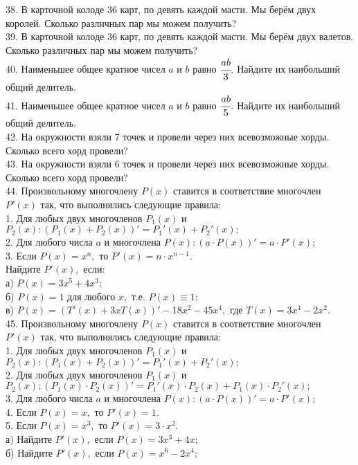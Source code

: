 38. В карточной колоде 36 карт, по девять каждой масти. Мы берём двух королей. Сколько различных пар мы можем получить?\\
39. В карточной колоде 36 карт, по девять каждой масти. Мы берём двух валетов. Сколько различных пар мы можем получить?\\
40. Наименьшее общее кратное чисел $a$ и $b$ равно $\cfrac{ab}{3}.$ Найдите их наибольший общий делитель.\\
41. Наименьшее общее кратное чисел $a$ и $b$ равно $\cfrac{ab}{5}.$ Найдите их наибольший общий делитель.\\
42. На окружности взяли 7 точек и провели через них всевозможные хорды. Сколько всего хорд провели?\\
43. На окружности взяли 6 точек и провели через них всевозможные хорды. Сколько всего хорд провели?\\
44. Произвольному многочлену $P(x)$ ставится в соответствие многочлен $P'(x)$ так, что выполнялись следующие правила:\\
1. Для любых двух многочленов $P_1(x)$ и $P_2(x): \left(P_1(x)+P_2(x)\right)'=P_1'(x)+P_2'(x);$\\
2. Для любого числа $a$ и многочлена $P(x): (a\cdot P(x))'=a\cdot P'(x);$\\
3. Если $P(x)=x^n,$ то $P'(x)=n\cdot x^{n-1}.$\\
Найдите $P'(x),$ если:\\
а) $P(x)=3x^5+4x^3;$\\
б) $P(x)=1$ для любого $x,$ т.е. $P(x)\equiv 1;$\\
в) $P(x)=(T'(x)+3xT(x))'-18x^2-45x^4,$ где $T(x)=3x^4-2x^2.$\\
45. Произвольному многочлену $P(x)$ ставится в соответствие многочлен $P'(x)$ так, что выполнялись следующие правила:\\
1. Для любых двух многочленов $P_1(x)$ и $P_2(x): \left(P_1(x)+P_2(x)\right)'=P_1'(x)+P_2'(x);$\\
2. Для любых двух многочленов $P_1(x)$ и $P_2(x): (P_1(x)\cdot P_2(x))'=P_1'(x)\cdot P_2(x)+P_1(x)\cdot P_2'(x);$\\
3. Для любого числа $a$ и многочлена $P(x): (a\cdot P(x))'=a\cdot P'(x);$\\
4. Если $P(x)=x,$ то $P'(x)=1.$\\
5. Если $P(x)=x^3,$ то $P'(x)=3\cdot x^2.$\\
а) Найдите $P'(x),$ если $P(x)=3x^3+4x;$\\
б) Найдите $P'(x),$ если $P(x)=x^6-2x^4;$\\
